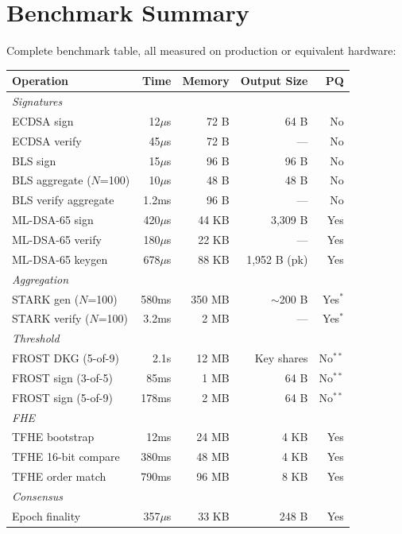 \documentclass[11pt,a4paper]{article}
\begin{document}
\section{Benchmark Summary}

Complete benchmark table, all measured on production or equivalent hardware:

\begin{center}
\begin{tabular}{lrrrr}
\toprule
\textbf{Operation} & \textbf{Time} & \textbf{Memory} & \textbf{Output Size} & \textbf{PQ} \\
\midrule
\multicolumn{5}{l}{\textit{Signatures}} \\
ECDSA sign & 12$\mu$s & 72 B & 64 B & No \\
ECDSA verify & 45$\mu$s & 72 B & --- & No \\
BLS sign & 15$\mu$s & 96 B & 96 B & No \\
BLS aggregate ($N$=100) & 10$\mu$s & 48 B & 48 B & No \\
BLS verify aggregate & 1.2ms & 96 B & --- & No \\
ML-DSA-65 sign & 420$\mu$s & 44 KB & 3,309 B & Yes \\
ML-DSA-65 verify & 180$\mu$s & 22 KB & --- & Yes \\
ML-DSA-65 keygen & 678$\mu$s & 88 KB & 1,952 B (pk) & Yes \\
\midrule
\multicolumn{5}{l}{\textit{Aggregation}} \\
STARK gen ($N$=100) & 580ms & 350 MB & $\sim$200 B & Yes$^*$ \\
STARK verify ($N$=100) & 3.2ms & 2 MB & --- & Yes$^*$ \\
\midrule
\multicolumn{5}{l}{\textit{Threshold}} \\
FROST DKG (5-of-9) & 2.1s & 12 MB & Key shares & No$^{**}$ \\
FROST sign (3-of-5) & 85ms & 1 MB & 64 B & No$^{**}$ \\
FROST sign (5-of-9) & 178ms & 2 MB & 64 B & No$^{**}$ \\
\midrule
\multicolumn{5}{l}{\textit{FHE}} \\
TFHE bootstrap & 12ms & 24 MB & 4 KB & Yes \\
TFHE 16-bit compare & 380ms & 48 MB & 4 KB & Yes \\
TFHE order match & 790ms & 96 MB & 8 KB & Yes \\
\midrule
\multicolumn{5}{l}{\textit{Consensus}} \\
Epoch finality & 357$\mu$s & 33 KB & 248 B & Yes \\
\bottomrule
\end{tabular}
\end{center}
\end{document}
